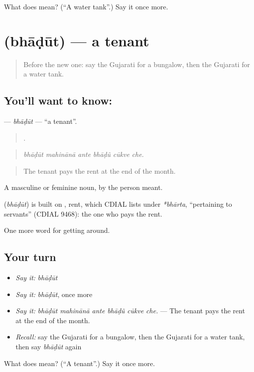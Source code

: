 \begin{tcolorbox}[breakable,colback=teal!4,colframe=teal!35!black,title={Before you move on}]
What does  mean? (\textquotedblleft{}A water tank\textquotedblright{}.) Say it once more.
\end{tcolorbox}
\section[\texorpdfstring{\gu{ભાડૂત} (bhāḍūt)}{ભાડૂત (bhāḍūt)}]{ (bhāḍūt) — a tenant}

\label{lesson:GU-C418-bhadut}



\begin{quote}
Before the new one: say the Gujarati for a bungalow, then the Gujarati for a water tank.
\end{quote}

\subsection*{You'll want to know: }
\textbf{} — \emph{bhāḍūt} — \textquotedblleft{}a tenant\textquotedblright{}.

\begin{quote}
     .
\end{quote}

\begin{quote}
\emph{bhāḍūt mahinānā ante bhāḍũ cūkve che.}
\end{quote}

\begin{quote}
The tenant pays the rent at the end of the month.
\end{quote}

A masculine or feminine noun, by the person meant.

\begin{cousinweb}
\textbf{} (\emph{bhāḍūt}) is built on , rent, which CDIAL lists under \emph{*bhārta}, \textquotedblleft{}pertaining to servants\textquotedblright{} (CDIAL 9468): the one who pays the rent.
\end{cousinweb}

\begin{grammarlens}[title={What you've built}]
One more word for getting around.
\end{grammarlens}

\subsection*{Your turn}
\begin{itemize}
\raggedright
  \item \emph{Say it:} \emph{bhāḍūt}
  \item \emph{Say it:} \emph{bhāḍūt}, once more
  \item \emph{Say it:} \emph{bhāḍūt mahinānā ante bhāḍũ cūkve che.} — The tenant pays the rent at the end of the month.
  \item \emph{Recall:} say the Gujarati for a bungalow, then the Gujarati for a water tank, then say \emph{bhāḍūt} again
\end{itemize}

\begin{tcolorbox}[breakable,colback=teal!4,colframe=teal!35!black,title={Before you move on}]
What does  mean? (\textquotedblleft{}A tenant\textquotedblright{}.) Say it once more.
\end{tcolorbox}
